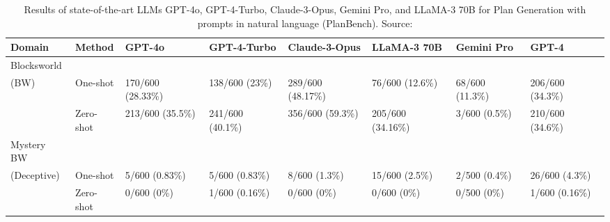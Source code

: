 \begin{table}[h]
	\centering
	\small
	\begin{tabularx}{\textwidth}{lXXXXXXX}
		\toprule
		\textbf{Domain} & \textbf{Method} & \textbf{GPT-4o}  & \textbf{GPT-4-Turbo} & \textbf{Claude-3-Opus} & \textbf{LLaMA-3 70B} & \textbf{Gemini Pro} & \textbf{GPT-4}   \\
		\midrule
		Blocksworld                                                                                                                                                          \\ (BW)       & One-shot        & 170/600 (28.33\%) & 138/600 (23\%)   & 289/600 (48.17\%) & 76/600 (12.6\%)   & 68/600 (11.3\%) & 206/600 (34.3\%) \\
		                & Zero-shot       & 213/600 (35.5\%) & 241/600 (40.1\%)     & 356/600 (59.3\%)       & 205/600 (34.16\%)    & 3/600 (0.5\%)       & 210/600 (34.6\%) \\
		Mystery BW                                                                                                                                                           \\ (Deceptive) & One-shot        & 5/600 (0.83\%)    & 5/600 (0.83\%)   & 8/600 (1.3\%)     & 15/600 (2.5\%)    & 2/500 (0.4\%)   & 26/600 (4.3\%)   \\
		                & Zero-shot       & 0/600 (0\%)      & 1/600 (0.16\%)       & 0/600 (0\%)            & 0/600 (0\%)          & 0/500 (0\%)         & 1/600 (0.16\%)   \\
		\bottomrule
	\end{tabularx}
	\caption{Results of state-of-the-art LLMs GPT-4o, GPT-4-Turbo, Claude-3-Opus, Gemini Pro, and LLaMA-3 70B for Plan Generation with prompts in natural language (PlanBench). Source: \textcite{kambhampati2024llmscantplanhelp}}
	\label{tab:llms-sota-plan}
\end{table}

